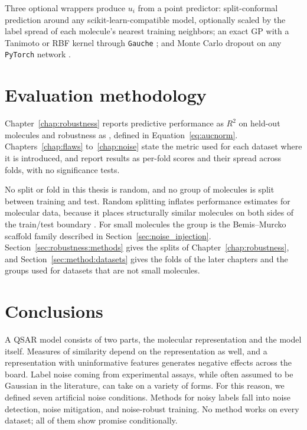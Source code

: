 Three optional wrappers produce $u_i$ from a point predictor: split-conformal prediction around any
scikit-learn-compatible model, optionally scaled by the label spread of each molecule's nearest
training neighbors; an exact GP with a Tanimoto or RBF kernel through \texttt{Gauche}
\citep{gauche}; and Monte Carlo dropout on any \texttt{PyTorch} network \citep{gal2016}.

\section{Evaluation methodology}\label{sec:evaluation}

Chapter~\ref{chap:robustness} reports predictive performance as $R^2$ on held-out molecules and robustness as \aucnorm{}, defined in Equation~\ref{eq:aucnorm}. Chapters~\ref{chap:flaws} to~\ref{chap:noise} state the metric used for each dataset where it is introduced, and report results as per-fold scores and their spread across folds, with no significance tests.

No split or fold in this thesis is random, and no group of molecules is split between training and test. Random splitting inflates performance estimates for molecular data, because it places structurally similar molecules on both sides of the train/test boundary \citep{Yang2019, Wallach2018, Landrum2023SIMPD}. For small molecules the group is the Bemis--Murcko scaffold family described in Section~\ref{sec:noise_injection}. Section~\ref{sec:robustness:methods} gives the splits of Chapter~\ref{chap:robustness}, and Section~\ref{sec:method:datasets} gives the folds of the later chapters and the groups used for datasets that are not small molecules.

\section{Conclusions}

A QSAR model consists of two parts, the molecular representation and the model itself. Measures of similarity depend on the representation as well, and a representation with uninformative features generates negative effects across the board. Label noise coming from experimental assays, while often assumed to be Gaussian in the literature, can take on a variety of forms. For this reason, we defined seven artificial noise conditions. Methods for noisy labels fall into noise detection, noise mitigation, and noise-robust training. No method works on every dataset; all of them show promise conditionally. 

